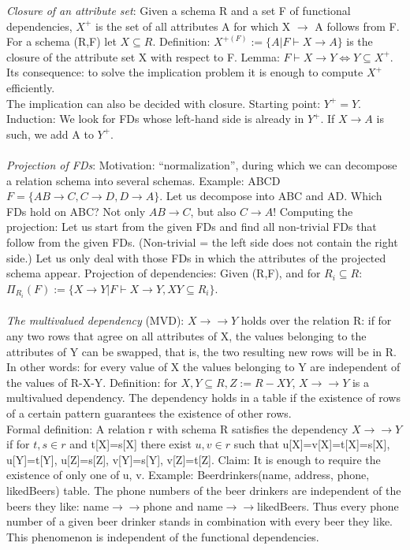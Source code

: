 \documentclass[margin=0px]{article}
\begin{document}
\textit{Closure of an attribute set}: Given a schema R and a set F of functional dependencies, $X^+$ is the set of all attributes A for which X $\to$ A follows from F. For a schema (R,F) let $X \subseteq R$. Definition: $X^{+(F)}:=\{A | F \vdash X \to A\}$ is the closure of the attribute set X with respect to F. Lemma: $F \vdash X \to Y \iff Y \subseteq X^+$. Its consequence: to solve the implication problem it is enough to compute $X^+$ efficiently. \\
The implication can also be decided with closure. Starting point: $Y^+ = Y$. Induction: We look for FDs whose left-hand side is already in $Y^+$. If $X \to A$ is such, we add A to $Y^+$. \\\\
\textit{Projection of FDs}: Motivation: ``normalization'', during which we can decompose a relation schema into several schemas. Example: ABCD $F=\{AB \to C, C \to D, D \to A\}$. Let us decompose into ABC and AD. Which FDs hold on ABC? Not only $AB \to C$, but also $C \to A$! Computing the projection: Let us start from the given FDs and find all non-trivial FDs that follow from the given FDs. (Non-trivial = the left side does not contain the right side.) Let us only deal with those FDs in which the attributes of the projected schema appear. Projection of dependencies: Given (R,F), and for $R_i \subseteq R$: $\Pi_{R_i}(F):=\{X \to Y | F \vdash X \to Y, XY \subseteq R_i\}$.\\ \\
\textit{The multivalued dependency} (MVD): $X \to\to Y$ holds over the relation R: if for any two rows that agree on all attributes of X, the values belonging to the attributes of Y can be swapped, that is, the two resulting new rows will be in R. In other words: for every value of X the values belonging to Y are independent of the values of R-X-Y. Definition: for $X,Y \subseteq R, Z:=R-XY$, $X \to\to Y$ is a multivalued dependency. The dependency holds in a table if the existence of rows of a certain pattern guarantees the existence of other rows. \\
Formal definition: A relation r with schema R satisfies the dependency $X \to\to Y$ if for $t,s \in r$ and t[X]=s[X] there exist $u,v \in r$ such that u[X]=v[X]=t[X]=s[X], u[Y]=t[Y], u[Z]=s[Z],
v[Y]=s[Y], v[Z]=t[Z]. Claim: It is enough to require the existence of only one of u, v.
Example: Beerdrinkers(name, address, phone, likedBeers) table. The phone numbers of the beer drinkers are independent of the beers they like: name$\to\to$phone and name$\to\to$likedBeers. Thus every phone number of a given beer drinker stands in combination with every beer they like. This phenomenon is independent of the functional dependencies. \\
\end{document}
